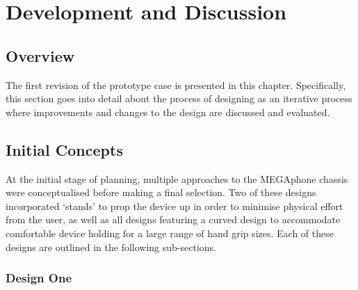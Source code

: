
\chapter{Development and Discussion} %

\label{Chapter4} %


\section{Overview}

The first revision of the prototype case is presented in this chapter. 
Specifically, this section goes into detail about the process of designing as an iterative process where improvements and changes to the design are discussed and evaluated.



\section{Initial Concepts}

At the initial stage of planning, multiple approaches to the MEGAphone chassis were conceptualised before making a final selection. 
Two of these designs incorporated ‘stands’ to prop the device up in order to minimise physical effort from the user, as well as all designs featuring a curved design to accommodate comfortable device holding for a large range of hand grip sizes. 
Each of these designs are outlined in the following sub-sections.

\subsection{Design One}


